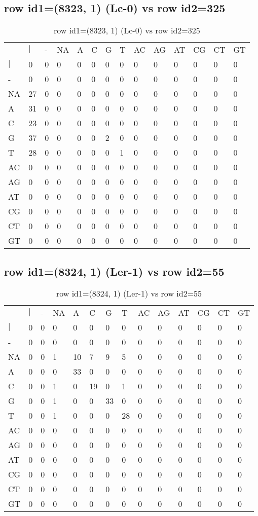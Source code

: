 \subsection{row id1=(8323, 1) (Lc-0) vs row id2=325}
\begin{center}
\begin{longtable}{|l|l|l|l|l|l|l|l|l|l|l|l|l|l|}
\caption{row id1=(8323, 1) (Lc-0) vs row id2=325} \label{table_dm518}\\
\hline
\\
\hline
&$|$&-&NA&A&C&G&T&AC&AG&AT&CG&CT&GT\\
$|$&0&0&0&0&0&0&0&0&0&0&0&0&0\\
-&0&0&0&0&0&0&0&0&0&0&0&0&0\\
NA&27&0&0&0&0&0&0&0&0&0&0&0&0\\
A&31&0&0&0&0&0&0&0&0&0&0&0&0\\
C&23&0&0&0&0&0&0&0&0&0&0&0&0\\
G&37&0&0&0&0&2&0&0&0&0&0&0&0\\
T&28&0&0&0&0&0&1&0&0&0&0&0&0\\
AC&0&0&0&0&0&0&0&0&0&0&0&0&0\\
AG&0&0&0&0&0&0&0&0&0&0&0&0&0\\
AT&0&0&0&0&0&0&0&0&0&0&0&0&0\\
CG&0&0&0&0&0&0&0&0&0&0&0&0&0\\
CT&0&0&0&0&0&0&0&0&0&0&0&0&0\\
GT&0&0&0&0&0&0&0&0&0&0&0&0&0\\
\hline
\end{longtable}
\end{center}

\subsection{row id1=(8324, 1) (Ler-1) vs row id2=55}
\begin{center}
\begin{longtable}{|l|l|l|l|l|l|l|l|l|l|l|l|l|l|}
\caption{row id1=(8324, 1) (Ler-1) vs row id2=55} \label{table_dm520}\\
\hline
\\
\hline
&$|$&-&NA&A&C&G&T&AC&AG&AT&CG&CT&GT\\
$|$&0&0&0&0&0&0&0&0&0&0&0&0&0\\
-&0&0&0&0&0&0&0&0&0&0&0&0&0\\
NA&0&0&1&10&7&9&5&0&0&0&0&0&0\\
A&0&0&0&33&0&0&0&0&0&0&0&0&0\\
C&0&0&1&0&19&0&1&0&0&0&0&0&0\\
G&0&0&1&0&0&33&0&0&0&0&0&0&0\\
T&0&0&1&0&0&0&28&0&0&0&0&0&0\\
AC&0&0&0&0&0&0&0&0&0&0&0&0&0\\
AG&0&0&0&0&0&0&0&0&0&0&0&0&0\\
AT&0&0&0&0&0&0&0&0&0&0&0&0&0\\
CG&0&0&0&0&0&0&0&0&0&0&0&0&0\\
CT&0&0&0&0&0&0&0&0&0&0&0&0&0\\
GT&0&0&0&0&0&0&0&0&0&0&0&0&0\\
\hline
\end{longtable}
\end{center}

